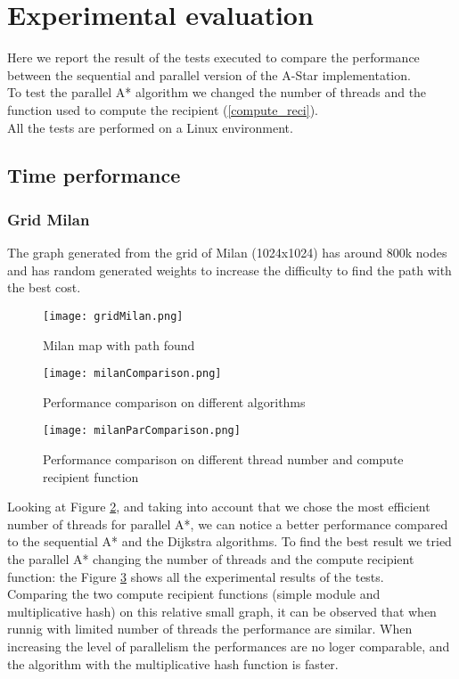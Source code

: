 \section{Experimental evaluation}
\label{Sec:experimental-eval}

Here we report the result of the tests executed to compare the performance between the sequential and parallel version of the A-Star implementation.\\
To test the parallel A* algorithm we changed the number of threads and the function used to compute the recipient (\ref{compute_reci}). \\
All the tests are performed on a Linux environment.

\subsection{Time performance}



\subsubsection{Grid Milan}
The graph generated from the grid of Milan (1024x1024) has around 800k nodes and has random generated weights to increase the difficulty to find the path with the best cost.

\begin{figure}
    \centering
    \texttt{[image: gridMilan.png]}
    \caption{Milan map with path found}
    \label{Milan-grid}
\end{figure}

\begin{figure}
    \centering
    \texttt{[image: milanComparison.png]}
    \caption{Performance comparison on different algorithms}
    \label{Milan-comp}
\end{figure}

\begin{figure}
    \centering
    \texttt{[image: milanParComparison.png]}
    \caption{Performance comparison on different thread number and compute recipient function}
    \label{Milan-par-comp}
\end{figure}


Looking at Figure \ref{Milan-comp}, and taking into account that we chose the most efficient number of threads for parallel A*,
we can notice a better performance compared to the sequential A* and the Dijkstra algorithms. 
To find the best result we tried the parallel A* changing the number of threads and the compute recipient function:
the Figure \ref{Milan-par-comp} shows all the experimental results of the tests.
\\
Comparing the two compute recipient functions (simple module and multiplicative hash)
on this relative small graph, it can be observed that when runnig with limited number of threads the performance are similar.
When increasing the level of parallelism the performances are no loger comparable, and the algorithm with the multiplicative hash function is faster.


